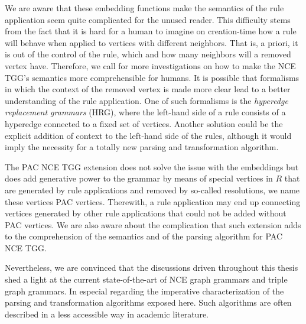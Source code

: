 We are aware that these embedding functions make the semantics of the rule application seem quite complicated for the unused reader. This difficulty stems from the fact that it is hard for a human to imagine on creation-time how a rule will behave when applied to vertices with different neighbors. That is, a priori, it is out of the control of the rule, which and how many neighbors will a removed vertex have. Therefore, we call for more investigations on how to make the NCE TGG's semantics more comprehensible for humans. It is possible that formalisms in which the context of the removed vertex is made more clear lead to a better understanding of the rule application. One of such formalisms is the \emph{hyperedge replacement grammars} (HRG), where the left-hand side of a rule consists of a hyperedge connected to a fixed set of vertices. Another solution could be the explicit addition of context to the left-hand side of the rules, although it would imply the necessity for a totally new parsing and transformation algorithm.

The PAC NCE TGG extension does not solve the issue with the embeddings but does add generative power to the grammar by means of special vertices in $R$ that are generated by rule applications and removed by so-called resolutions, we name these vertices PAC vertices. Therewith, a rule application may end up connecting vertices generated by other rule applications that could not be added without PAC vertices. We are also aware about the complication that such extension adds to the comprehension of the semantics and of the parsing algorithm for PAC NCE TGG.

Nevertheless, we are convinced that the discussions driven throughout this thesis shed a light at the current state-of-the-art of NCE graph grammars and triple graph grammars. In especial regarding the imperative characterization of the parsing and transformation algorithms exposed here. Such algorithms are often described in a less accessible way in academic literature.

